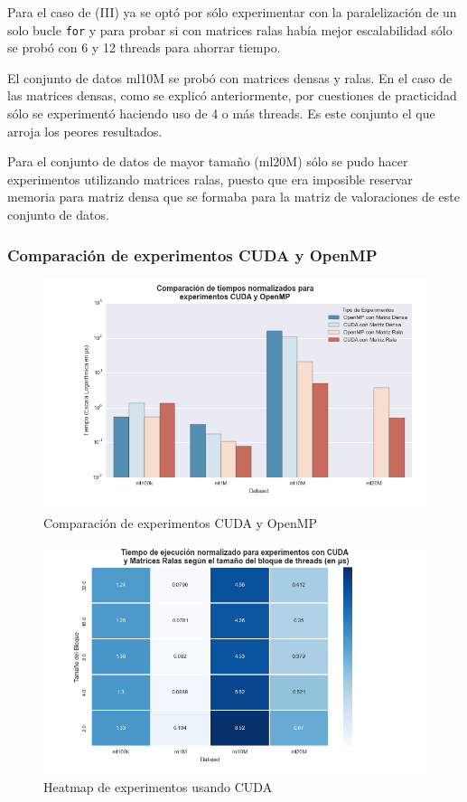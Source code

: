 \documentclass[11pt, a4paper]{article}
\begin{document}
  Para el caso de (III) ya se optó por sólo experimentar con la paralelización
  de un solo bucle \texttt{for} y para probar si con matrices ralas había mejor
  escalabilidad sólo se probó con 6 y 12 threads para ahorrar tiempo.

  El conjunto de datos ml10M se probó con matrices densas y ralas. En el caso
  de las matrices densas, como se explicó anteriormente, por cuestiones de
  practicidad sólo se experimentó haciendo uso de 4 o más threads. Es este
  conjunto el que arroja los peores resultados.

  Para el conjunto de datos de mayor tamaño (ml20M) sólo se pudo hacer
  experimentos utilizando matrices ralas, puesto que era imposible reservar
  memoria para matriz densa que se formaba para la matriz de valoraciones de
  este conjunto de datos.

  \subsubsection{Comparación de experimentos CUDA y OpenMP}
  
  \begin{figure}[ht]
    \centering
    \includegraphics[width=\textwidth]{plots/cuda_omp.png}
      \caption{Comparación de experimentos CUDA y OpenMP}\label{fig:bar:cuda:omp}
  \end{figure}

  \begin{figure}[ht]
    \centering
    \includegraphics[width=\textwidth]{plots/cuda_sparse_blocks.png}
      \caption{Heatmap de experimentos usando CUDA}\label{fig:heatmap:cuda}
  \end{figure}
\end{document}
